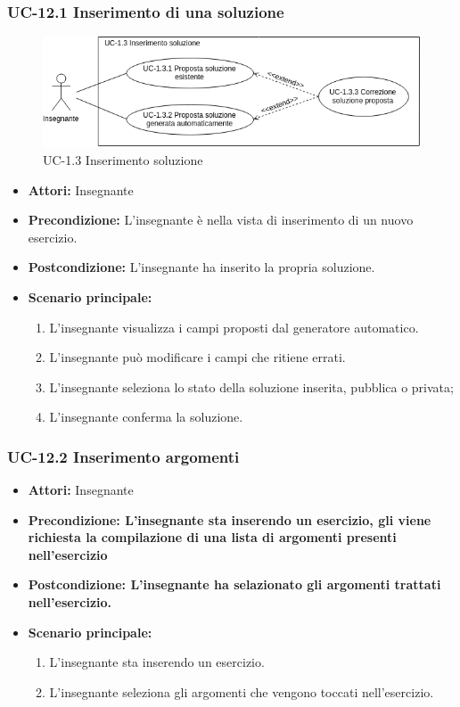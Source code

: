 \subsubsection{UC-12.1 Inserimento di una soluzione}
\begin{figure}[htbp]
	\centering
	\includegraphics[scale=0.7]{images/UC-1_3.png}
	\caption{UC-1.3 Inserimento soluzione}
\end{figure}
\begin{itemize}
\item \textbf{Attori: }Insegnante
\item \textbf{Precondizione: }L'insegnante è nella vista di inserimento di un nuovo esercizio.
\item \textbf{Postcondizione: }L'insegnante ha inserito la propria soluzione.
\item \textbf{Scenario principale: }
		\begin{enumerate} 
		\item L'insegnante visualizza i campi proposti dal generatore automatico. 
		\item L'insegnante può modificare i campi che ritiene errati.
		\item L'insegnante seleziona lo stato della soluzione inserita, pubblica o privata;
		\item L'insegnante conferma la soluzione.
		\end{enumerate}	
\end{itemize}

\subsubsection{UC-12.2 Inserimento argomenti}
\begin{itemize}
\item \textbf{Attori: }Insegnante

\item \textbf{Precondizione: L'insegnante sta inserendo un esercizio, gli viene richiesta la compilazione di una lista di argomenti presenti nell'esercizio}
\item \textbf{Postcondizione: L'insegnante ha selazionato gli argomenti trattati nell'esercizio.}
\item \textbf{Scenario principale: }
		\begin{enumerate}
		\item L'insegnante sta inserendo un esercizio. 
		\item L'insegnante seleziona gli argomenti che vengono toccati nell'esercizio. 
		\end{enumerate}
\end{itemize}				


